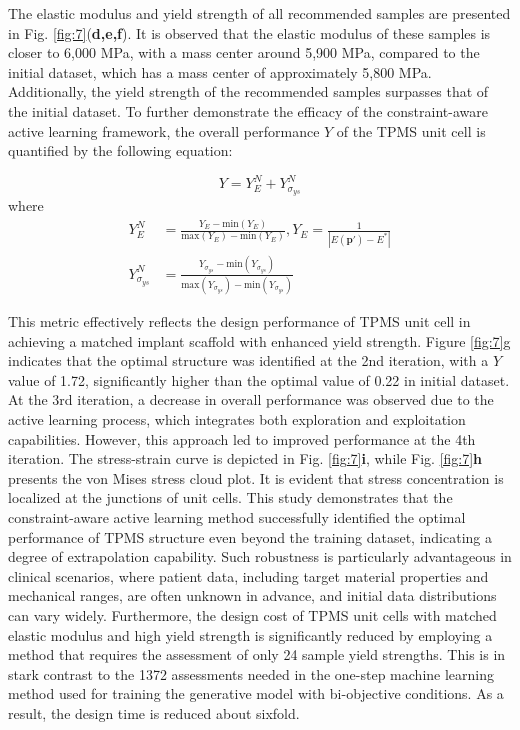 \documentclass[preprint,review,12pt,authoryear]{elsarticle}
\begin{document}
The elastic modulus and yield strength of all recommended samples are presented in Fig. \ref{fig:7}(\textbf{d,e,f}). It is observed that the elastic modulus of these samples is closer to 6,000 MPa, with a mass center around 5,900 MPa, compared to the initial dataset, which has a mass center of approximately 5,800 MPa. Additionally, the yield strength of the recommended samples surpasses that of the initial dataset. To further demonstrate the efficacy of the constraint-aware active learning framework, the overall performance $Y$ of the TPMS unit cell is quantified by the following equation:

\begin{equation}
    Y = Y_E^N+Y_{\sigma_{ys}}^N
\label{eq:23}
\end{equation}
where 
\begin{equation}
    \begin{aligned}
    Y_E^N &= \frac{Y_E-\text{min}(Y_E)}{\text{max}(Y_E)-\text{min}(Y_E)} 
 ,Y_E = \frac{1}{|E(\boldsymbol{p}')-E^*|}\\
    Y^N_{\sigma_{ys}}& =\frac{Y_{\sigma_{ys}}-\text{min}(Y_{\sigma_{ys}})}{\text{max}(Y_{\sigma_{ys}})-\text{min}(Y_{\sigma_{ys}})} 
    \end{aligned}
\label{eq:24}
\end{equation}

This metric effectively reflects the design performance of TPMS unit cell in achieving a matched implant scaffold with enhanced yield strength. Figure \ref{fig:7}g indicates that the optimal structure was identified at the 2nd iteration, with a $Y$ value of 1.72, significantly higher than the optimal value of 0.22 in initial dataset. At the 3rd iteration, a decrease in overall performance was observed due to the active learning process, which integrates both exploration and exploitation capabilities. However, this approach led to improved performance at the 4th iteration. The stress-strain curve is depicted in Fig. \ref{fig:7}\textbf{i}, while Fig. \ref{fig:7}\textbf{h} presents the von Mises stress cloud plot. It is evident that stress concentration is localized at the junctions of unit cells. This study demonstrates that the constraint-aware active learning method successfully identified the optimal performance of TPMS structure even beyond the training dataset, indicating a degree of extrapolation capability. Such robustness is particularly advantageous in clinical scenarios, where patient data, including target material properties and mechanical ranges, are often unknown in advance, and initial data distributions can vary widely. Furthermore, the design cost of TPMS unit cells with matched elastic modulus and high yield strength is significantly reduced by employing a method that requires the assessment of only 24 sample yield strengths. This is in stark contrast to the 1372 assessments needed in the one-step machine learning method used for training the generative model with bi-objective conditions. As a result, the design time is reduced about sixfold.
\end{document}
